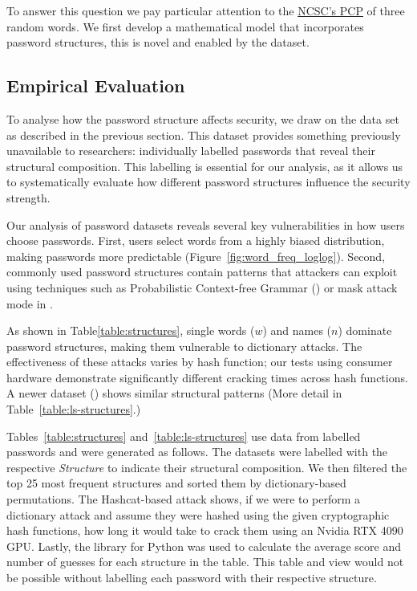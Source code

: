 To answer this question we pay particular attention to the  \hyperref[jmp::chp4::ncsc-pcp]{NCSC's PCP} of three random words. We first develop a mathematical model that incorporates password structures, this is novel and enabled by the \pwdninja dataset.

\subsection{Empirical Evaluation}
To analyse how the password structure affects security, we draw on the data set \pwdninja as described in the previous section. This dataset provides something previously unavailable to researchers: individually labelled passwords that reveal their structural composition. This labelling is essential for our analysis, as it allows us to systematically evaluate how different password structures influence the security strength.

Our analysis of password datasets reveals several key vulnerabilities in how users choose passwords. First, users select words from a highly biased distribution, making passwords more predictable (Figure~\ref{fig:word_freq_loglog}). Second, commonly used password structures contain patterns that attackers can exploit using techniques such as Probabilistic Context-free Grammar (\pcfg) or mask attack mode in \hashcat.

As shown in Table\;\ref{table:structures}, single words ($w$) and names ($n$) dominate password structures, making them vulnerable to dictionary attacks. The effectiveness of these attacks varies by hash function; our tests using consumer hardware demonstrate significantly different cracking times across hash functions. A newer dataset () shows similar structural patterns (More detail in Table~\ref{table:ls-structures}.)

Tables~\ref{table:structures} and~\ref{table:ls-structures} use data from labelled passwords and were generated as follows. The datasets were labelled with the respective \textit{Structure} to indicate their structural composition. We then filtered the top 25 most frequent structures and sorted them by dictionary-based permutations. The Hashcat-based attack shows, if we were to perform a dictionary attack and assume they were hashed using the given cryptographic hash functions, how long it would take to crack them using an Nvidia RTX 4090 GPU. Lastly, the \zxcvbn library for Python was used to calculate the average score and number of guesses for each structure in the table. This table and view would not be possible without labelling each password with their respective structure.

